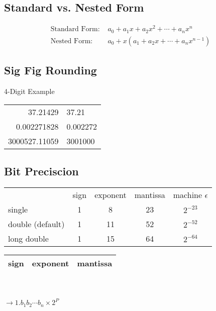 \documentclass[10pt]{article}
\begin{document}
\begin{multicols}{2}
    \small
    \begin{minipage}{\columnwidth}
        \subsection*{Standard vs. Nested Form}
        \begin{align*}
            \text{Standard Form: } & a_0 + a_1 x + a_2 x^2 + \cdots + a_n x^n  \\
            \text{Nested Form: }   & a_0 + x(a_1 + a_2x + \cdots + a_nx^{n-1})
        \end{align*}
        \subsection*{Sig Fig Rounding}
        \tiny
        4-Digit Example \\
        \small
        \begin{tabular}{rl}
            37.21429      & 37.21    \\
            0.002271828   & 0.002272 \\
            3000527.11059 & 3001000  \\
        \end{tabular}
        \subsection*{Bit Preciscion}
        \begin{tabular}{lcccc}
                             & sign & exponent & mantissa & machine \(\epsilon\) \\
            single           & 1    & 8        & 23       & \(2^{-23}\)          \\
            double (default) & 1    & 11       & 52       & \(2^{-52}\)          \\
            long double      & 1    & 15       & 64       & \(2^{-64}\)
        \end{tabular}
        \begin{multicols}{2}
            \begin{tabular}{|c|c|c|}
                \hline
                sign & exponent & mantissa \\
                \hline
            \end{tabular}
            \\ \\
            \(\rightarrow 1.b_1b_2 \cdots b_n \times 2^P\)
        \end{multicols}

\end{minipage}
\end{multicols}
\end{document}
